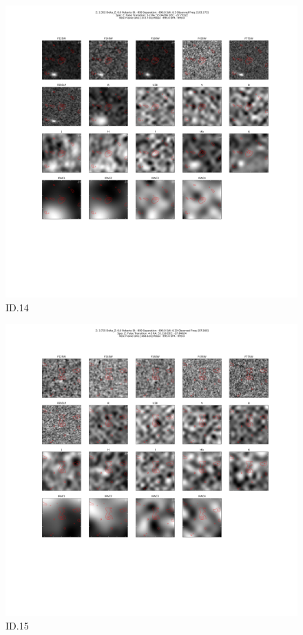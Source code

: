 \begin{figure}[tbp]
\centering \includegraphics[width=120mm]{Matched/ASPECS_Cutout_14.png}
\caption{ID.14}
\label{fig:Match_Three}
\end{figure}

\begin{figure}[tbp]
\centering \includegraphics[width=120mm]{Matched/ASPECS_Cutout_15.png}
\caption{ID.15}
\label{fig:Match_Three}
\end{figure}

